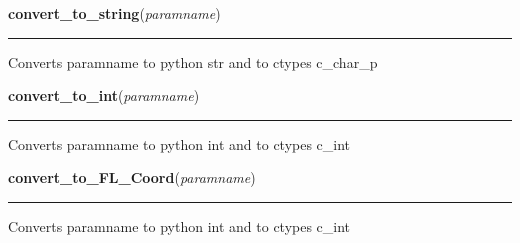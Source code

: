     \label{xformslib:library:convert_to_string}

    \vspace{0.5ex}

\hspace{.8\funcindent}\begin{boxedminipage}{\funcwidth}

    \raggedright \textbf{convert\_to\_string}(\textit{paramname})

    \vspace{-1.5ex}

    \rule{\textwidth}{0.5\fboxrule}
\setlength{\parskip}{2ex}

Converts paramname to python str and to ctypes c\_char\_p
\setlength{\parskip}{1ex}
    \end{boxedminipage}

    \label{xformslib:library:convert_to_int}

    \vspace{0.5ex}

\hspace{.8\funcindent}\begin{boxedminipage}{\funcwidth}

    \raggedright \textbf{convert\_to\_int}(\textit{paramname})

    \vspace{-1.5ex}

    \rule{\textwidth}{0.5\fboxrule}
\setlength{\parskip}{2ex}

Converts paramname to python int and to ctypes c\_int
\setlength{\parskip}{1ex}
    \end{boxedminipage}

    \label{xformslib:library:convert_to_int}

    \vspace{0.5ex}

\hspace{.8\funcindent}\begin{boxedminipage}{\funcwidth}

    \raggedright \textbf{convert\_to\_FL\_Coord}(\textit{paramname})

    \vspace{-1.5ex}

    \rule{\textwidth}{0.5\fboxrule}
\setlength{\parskip}{2ex}

Converts paramname to python int and to ctypes c\_int
\setlength{\parskip}{1ex}
    \end{boxedminipage}

